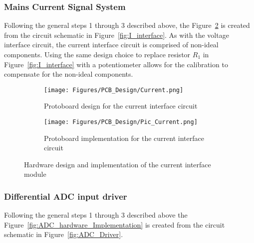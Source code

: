 \subsubsection{Mains Current Signal System}
\label{sec:H_I}
Following the general steps 1 through 3 described above, the
Figure~\ref{fig:I_hardware_Implementation} is created from the circuit
schematic in Figure~\ref{fig:I_interface}. As with the voltage interface circuit, the current interface circuit is comprised of non-ideal components. Using the same design choice to replace resistor $R_{1}$ in  Figure~\ref{fig:I_interface} with a potentiometer allows for the calibration to compensate for the non-ideal components. 
\begin{figure}[H]
     \centering
     \begin{subfigure}[b]{0.495\textwidth}
        \centering
        \texttt{[image: Figures/PCB\_Design/Current.png]}
        \caption{Protoboard design for the current interface circuit}
        \label{fig:I_hardware_Design}
     \end{subfigure}
     \hfill
     \begin{subfigure}[b]{0.495\textwidth}
        \centering
        \texttt{[image: Figures/PCB\_Design/Pic\_Current.png]}
        \caption{Protoboard implementation for the current interface circuit}
        \label{fig:I_hardware_Implementation}
     \end{subfigure}
        \caption{Hardware design and implementation of the current interface module}
        \label{fig:I_hardware_Comparison}
\end{figure}

\subsubsection{Differential ADC input driver}
\label{sec:H_ADC}

Following the general steps 1 through 3 described above the Figure~\ref{fig:ADC_hardware_Implementation} is created from the circuit schematic in Figure~\ref{fig:ADC_Driver}. 

